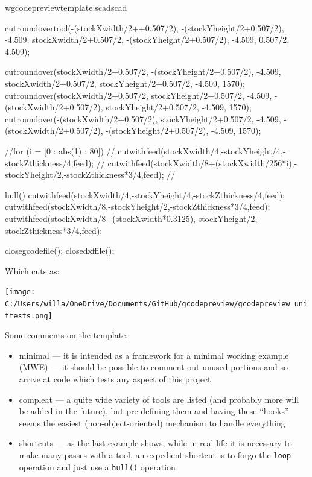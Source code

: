 \documentclass{ltxdoc}
\begin{document}
\begin{writecode}{w}{gcodepreviewtemplate.scad}{scad}
{cutroundovertool(-(stockXwidth/2++0.507/2), -(stockYheight/2+0.507/2), -4.509, stockXwidth/2+0.507/2, -(stockYheight/2+0.507/2), -4.509, 0.507/2, 4.509);

cutroundover(stockXwidth/2+0.507/2, -(stockYheight/2+0.507/2), -4.509, stockXwidth/2+0.507/2, stockYheight/2+0.507/2, -4.509, 1570);
cutroundover(stockXwidth/2+0.507/2, stockYheight/2+0.507/2, -4.509, -(stockXwidth/2+0.507/2), stockYheight/2+0.507/2, -4.509, 1570);
cutroundover(-(stockXwidth/2+0.507/2), stockYheight/2+0.507/2, -4.509, -(stockXwidth/2+0.507/2), -(stockYheight/2+0.507/2), -4.509, 1570);

//for (i = [0 : abs(1) : 80]) {
//  cutwithfeed(stockXwidth/4,-stockYheight/4,-stockZthickness/4,feed);
//  cutwithfeed(stockXwidth/8+(stockXwidth/256*i),-stockYheight/2,-stockZthickness*3/4,feed);
//  }

hull(){
  cutwithfeed(stockXwidth/4,-stockYheight/4,-stockZthickness/4,feed);
  cutwithfeed(stockXwidth/8,-stockYheight/2,-stockZthickness*3/4,feed);
  cutwithfeed(stockXwidth/8+(stockXwidth*0.3125),-stockYheight/2,-stockZthickness*3/4,feed);
  }
}

closegcodefile();
closedxffile();
\end{writecode}
\addtocounter{gcptmpl}{157}

%
%

\begin{samepage}
Which cuts as:

\texttt{[image: C:/Users/willa/OneDrive/Documents/GitHub/gcodepreview/gcodepreview\_unittests.png]}
\end{samepage}

Some comments on the template:

\begin{itemize}
\item minimal --- it is intended as a framework for a minimal working example (MWE) --- it should be
                  possible to comment out unused portions and so arrive at code which tests
                  any aspect of this project
\item compleat --- a quite wide variety of tools are listed (and probably more will be
                   added in the future), but pre-defining them and having these ``hooks'' seems
                   the easiest (non-object-oriented) mechanism to handle everything
\item shortcuts --- as the last example shows, while in real life it is necessary to make many 
                    passes with a tool, an expedient shortcut is to forgo the \verb|loop| 
                    operation and just use a \verb|hull()| operation
\end{itemize}
\end{document}

